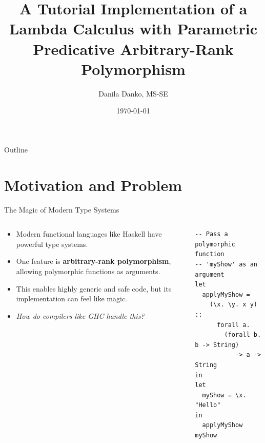 \documentclass[serif, aspectratio=169]{beamer}
\author[Danko]{Danila Danko, MS-SE \inst{1} \and \newline \newline {Supervisor: Nikolai Kudasov \inst{1}}}
\title{A Tutorial Implementation of a Lambda Calculus with
Parametric Predicative Arbitrary-Rank Polymorphism}
\institute{
    \inst{1}Innopolis University
}
\date{\small \today}
\begin{document}
\begin{frame}
  \titlepage
\end{frame}

\begin{frame}{Outline}
  \tableofcontents
\end{frame}

\section{Motivation and Problem}

\begin{frame}[containsverbatim]{The Magic of Modern Type Systems}
  \begin{columns}[T]
    \begin{column}{0.5\textwidth}
      \begin{itemize}
        \item Modern functional languages like Haskell have powerful type systems.
        \item One feature is \textbf{arbitrary-rank polymorphism}, allowing polymorphic functions as arguments.
        \item This enables highly generic and safe code, but its implementation can feel like magic.
        \item \textit{How do compilers like GHC handle this?}
      \end{itemize}
    \end{column}
    \begin{column}{0.5\textwidth}
      \begin{verbatim}
-- Pass a polymorphic function 
-- 'myShow' as an argument
let
  applyMyShow =
    (\x. \y. x y) ::
      forall a.
        (forall b. b -> String) 
           -> a -> String
in
let
  myShow = \x. "Hello"
in
  applyMyShow myShow
            \end{verbatim}
    \end{column}
  \end{columns}
\end{frame}
\end{document}
